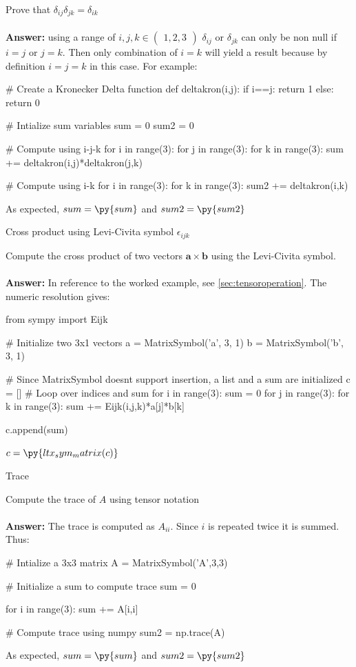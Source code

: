Prove that $\delta_{ij}\delta_{jk} = \delta_{ik}$
\\\\
\textbf{Answer: } using a range of $i,j,k \in \begin{pmatrix} 
    {1,2,3}
\end{pmatrix}$
$\delta_{ij}$ or $\delta_{jk}$ can only be non null if $i=j$ or $j=k$. Then only combination of $i=k$ will yield a result because by definition $i=j=k$ in this case.
For example:

\begin{pyblock}
# Create a Kronecker Delta function
def deltakron(i,j):
    if i==j:
        return 1 
    else:
        return 0

# Intialize sum variables
sum = 0
sum2 = 0

# Compute using i-j-k
for i in range(3):
    for j in range(3):
        for k in range(3):
            sum += deltakron(i,j)*deltakron(j,k)

# Compute using i-k
for i in range(3):
        for k in range(3):
            sum2 += deltakron(i,k)
\end{pyblock}
As expected, $sum = \py{sum}$ and $sum2 = \py{sum2}$

\begin{problem}
    Cross product using Levi-Civita symbol $\epsilon_{ijk}$
\end{problem}
Compute the cross product of two vectors $\mathbf{a} \times \mathbf{b}$ using the Levi-Civita symbol.
\\\\
\textbf{Answer: } In reference to the worked example, see \cref{sec:tensoroperation}. The numeric resolution gives:

\begin{pyblock}
from sympy import Eijk

# Initialize two 3x1 vectors
a = MatrixSymbol('a', 3, 1)
b = MatrixSymbol('b', 3, 1)

# Since MatrixSymbol doesnt support insertion, a list and a sum are initialized
c = []
# Loop over indices and sum
for i in range(3):
    sum = 0
    for j in range(3):
        for k in range(3):
            sum += Eijk(i,j,k)*a[j]*b[k]
    
    c.append(sum)

\end{pyblock}

$c = \py{ltx_sym_matrix(c)}$

\begin{problem}
    Trace
\end{problem}
Compute the trace of $A$ using tensor notation
\\\\
\textbf{Answer: } The trace is computed as $A_{ii}$. Since $i$ is repeated twice it is summed. Thus:
\begin{pyblock}
# Intialize a 3x3 matrix
A = MatrixSymbol('A',3,3)

# Initialize a sum to compute trace
sum = 0

for i in range(3):
    sum += A[i,i]

# Compute trace using numpy
sum2 = np.trace(A)
\end{pyblock}

As expected, $sum=\py{sum}$ and $sum2=\py{sum2}$

